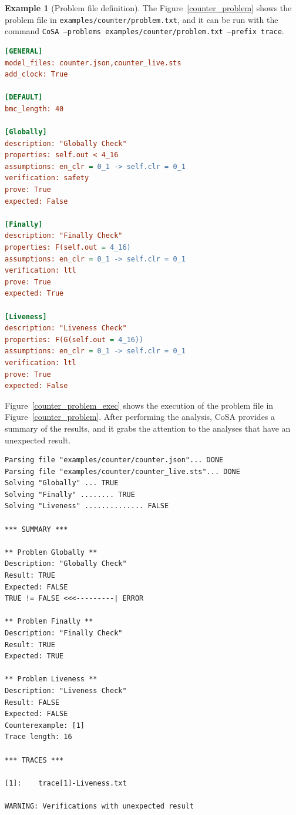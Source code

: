 \documentclass{article}
\theoremstyle{definition}
\newtheorem{example}{Example}[section]
\begin{document}
\begin{example}[Problem file definition]
The Figure~\ref{counter_problem} shows the problem file in
\texttt{examples/counter/problem.txt}, and it can be run with the
command \texttt{CoSA --problems examples/counter/problem.txt --prefix
  trace}.
  
\begin{lstlisting}[frame=single,language=Ini,caption=Problem file in \texttt{examples/counter/problem.txt},label=counter_problem]
[GENERAL]
model_files: counter.json,counter_live.sts
add_clock: True

[DEFAULT]
bmc_length: 40

[Globally]
description: "Globally Check"
properties: self.out < 4_16
assumptions: en_clr = 0_1 -> self.clr = 0_1
verification: safety
prove: True
expected: False

[Finally]
description: "Finally Check"
properties: F(self.out = 4_16)
assumptions: en_clr = 0_1 -> self.clr = 0_1
verification: ltl
prove: True
expected: True

[Liveness]
description: "Liveness Check"
properties: F(G(self.out = 4_16))
assumptions: en_clr = 0_1 -> self.clr = 0_1
verification: ltl
prove: True
expected: False
\end{lstlisting}

Figure~\ref{counter_problem_exec} shows the execution of the problem
file in Figure~\ref{counter_problem}. After performing the analysis,
CoSA provides a summary of the results, and it grabs the attention to
the analyses that have an unexpected result.

\begin{lstlisting}[frame=single,language=ets,caption=Analysis for the problem in Figure~\ref{counter_problem},label=counter_problem_exec]
Parsing file "examples/counter/counter.json"... DONE
Parsing file "examples/counter/counter_live.sts"... DONE
Solving "Globally" ... TRUE
Solving "Finally" ........ TRUE
Solving "Liveness" .............. FALSE

*** SUMMARY ***

** Problem Globally **
Description: "Globally Check"
Result: TRUE
Expected: FALSE
TRUE != FALSE <<<---------| ERROR

** Problem Finally **
Description: "Finally Check"
Result: TRUE
Expected: TRUE

** Problem Liveness **
Description: "Liveness Check"
Result: FALSE
Expected: FALSE
Counterexample: [1]
Trace length: 16

*** TRACES ***

[1]:	trace[1]-Liveness.txt

WARNING: Verifications with unexpected result
\end{lstlisting}

\end{example}
\end{document}
